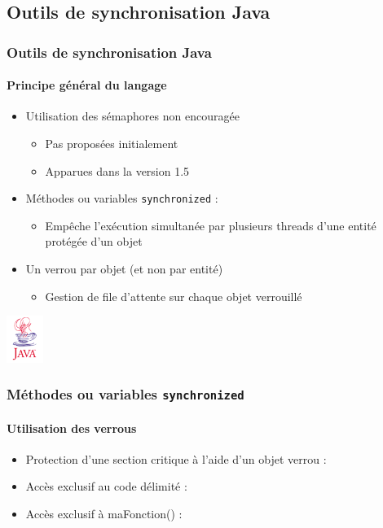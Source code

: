 \subsection{Outils de synchronisation Java}

\begin{frame}
\frametitle{Outils de synchronisation Java}
\framesubtitle{Principe général du langage}
\begin{itemize}
\item <1-> Utilisation des sémaphores non encouragée
\begin{itemize}
\item Pas proposées initialement
\item Apparues dans la version 1.5
\end{itemize}
\item <2-> Méthodes ou variables \texttt{synchronized} :
\begin{itemize}
\item Empêche l’exécution simultanée par plusieurs threads d’une entité protégée d’un objet
\end{itemize}
\item <3-> Un verrou par objet (et non par entité)
\begin{itemize}
\item Gestion de file d’attente sur chaque objet verrouillé
\end{itemize}
\end{itemize}
\begin{flushright}
\includegraphics[width=1.2cm]{../illustration/java.png}
\end{flushright}
\end{frame}

\begin{frame}
\frametitle{Méthodes ou variables \texttt{synchronized}}
\framesubtitle{Utilisation des verrous}
\begin{itemize}
\item Protection d'une section critique à l'aide d'un objet verrou :
\begin{scriptsize}\end{scriptsize}
\item Accès exclusif au code délimité :
\begin{scriptsize}\end{scriptsize}
\item Accès exclusif à maFonction() :
\begin{scriptsize}\end{scriptsize}
\end{itemize}
\end{frame}

